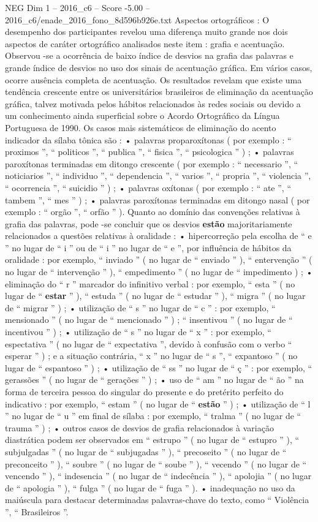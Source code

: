 \begin{textsample}{NEG Dim 1 – 2016\_c6 – Score -5.00 – 2016\_c6/enade\_2016\_fono\_8d596b926e.txt}
Aspectos ortográficos : O desempenho dos participantes revelou uma diferença muito grande nos dois aspectos de caráter ortográfico analisados neste item : grafia e acentuação.
Observou -se a ocorrência de baixo índice de desvios na grafia das palavras e grande índice de desvios no uso dos sinais de acentuação gráfica.
Em vários casos, ocorre ausência completa de acentuação.
Os resultados revelam que existe uma tendência crescente entre os universitários brasileiros de eliminação da acentuação gráfica, talvez motivada pelos hábitos relacionados às redes sociais ou devido a um conhecimento ainda superficial sobre o Acordo Ortográfico da Língua Portuguesa de 1990.
Os casos mais sistemáticos de eliminação do acento indicador da sílaba tônica são : • palavras proparoxítonas ( por exemplo : “ proximos ”, “ politicos ”, “ publica ”, “ fisica ”, “ psicologica ” ) ; • palavras paroxítonas terminadas em ditongo crescente ( por exemplo : “ necessario ”, “ noticiarios ”, “ individuo ”, “ dependencia ”, “ varios ”, “ propria ”, “ violencia ”, “ ocorrencia ”, “ suicidio ” ) ; • palavras oxítonas ( por exemplo : “ ate ”, “ tambem ”, “ mes ” ) ; • palavras paroxítonas terminadas em ditongo nasal ( por exemplo : “ orgão ”, “ orfão ” ).
Quanto ao domínio das convenções relativas à grafia das palavras, pode -se concluir que os desvios \textbf{estão} majoritariamente relacionados a questões relativas à oralidade : • hipercorreção pela escolha de “ e ” no lugar de “ i ” ou de “ i ” no lugar de “ e ”, por influência de hábitos da oralidade : por exemplo, “ inviado ” ( no lugar de “ enviado ” ), “ entervenção ” ( no lugar de “ intervenção ” ), “ empedimento ” ( no lugar de “ impedimento ) ; • eliminação do “ r ” marcador do infinitivo verbal : por exemplo, “ esta ” ( no lugar de “ \textbf{estar} ” ), “ estuda ” ( no lugar de “ estudar ” ), “ migra ” ( no lugar de “ migrar ” ) ; • utilização de “ s ” no lugar de “ c ” : por exemplo, “ mensionado ” ( no lugar de “ mencionado ” ) ; “ insentivou ” ( no lugar de “ incentivou ” ) ; • utilização de “ s ” no lugar de “ x ” : por exemplo, “ espectativa ” ( no lugar de “ expectativa ”, devido à confusão com o verbo “ esperar ” ) ; e a situação contrária, “ x ” no lugar de “ s ”, “ expantoso ” ( no lugar de “ espantoso ” ) ; • utilização de “ ss ” no lugar de “ ç ” : por exemplo, “ gerassões ” ( no lugar de “ gerações ” ) ; • uso de “ am ” no lugar de “ ão ” na forma de terceira pessoa do singular do presente e do pretérito perfeito do indicativo : por exemplo, “ estam ” ( no lugar de “ \textbf{estão} ” ) ; • utilização de “ l ” no lugar de “ u ” em final de sílaba : por exemplo, “ tralma ” ( no lugar de “ trauma ” ) ; • outros casos de desvios de grafia relacionados à variação diastrática podem ser observados em “ estrupo ” ( no lugar de “ estupro ” ), “ subjulgadas ” ( no lugar de “ subjugadas ” ), “ precoseito ” ( no lugar de “ preconceito ” ), “ soubre ” ( no lugar de “ soube ” ), “ vecendo ” ( no lugar de “ vencendo ” ), “ indesencia ” ( no lugar de “ indecência ” ), “ apolojia ” ( no lugar de “ apologia ” ), “ fulga ” ( no lugar de “ fuga ” ). • inadequação no uso da maiúscula para destacar determinadas palavras-chave do texto, como “ Violência ”, “ Brasileiros ”.

\end{textsample}
